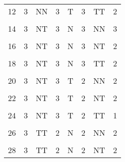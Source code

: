 \begin{table}[H]
{\begin{tabular}[t]{cccccccc}
			12 & 3 & NN & 3 & T & 3 & TT & 2\\
			\cellcolor{gray!6}{13} & \cellcolor{gray!6}{3} & \cellcolor{gray!6}{NT} & \cellcolor{gray!6}{3} & \cellcolor{gray!6}{N} & \cellcolor{gray!6}{3} & \cellcolor{gray!6}{NN} & \cellcolor{gray!6}{3}\\
			14 & 3 & NT & 3 & N & 3 & NN & 3\\
			\cellcolor{gray!6}{15} & \cellcolor{gray!6}{3} & \cellcolor{gray!6}{NT} & \cellcolor{gray!6}{3} & \cellcolor{gray!6}{N} & \cellcolor{gray!6}{3} & \cellcolor{gray!6}{NT} & \cellcolor{gray!6}{2}\\
			16 & 3 & NT & 3 & N & 3 & NT & 2\\
			\cellcolor{gray!6}{17} & \cellcolor{gray!6}{3} & \cellcolor{gray!6}{NT} & \cellcolor{gray!6}{3} & \cellcolor{gray!6}{N} & \cellcolor{gray!6}{3} & \cellcolor{gray!6}{TT} & \cellcolor{gray!6}{2}\\
			18 & 3 & NT & 3 & N & 3 & TT & 2\\
			\cellcolor{gray!6}{19} & \cellcolor{gray!6}{3} & \cellcolor{gray!6}{NT} & \cellcolor{gray!6}{3} & \cellcolor{gray!6}{T} & \cellcolor{gray!6}{2} & \cellcolor{gray!6}{NN} & \cellcolor{gray!6}{2}\\
			20 & 3 & NT & 3 & T & 2 & NN & 2\\
			\cellcolor{gray!6}{21} & \cellcolor{gray!6}{3} & \cellcolor{gray!6}{NT} & \cellcolor{gray!6}{3} & \cellcolor{gray!6}{T} & \cellcolor{gray!6}{2} & \cellcolor{gray!6}{NT} & \cellcolor{gray!6}{2}\\
			22 & 3 & NT & 3 & T & 2 & NT & 2\\
			\cellcolor{gray!6}{23} & \cellcolor{gray!6}{3} & \cellcolor{gray!6}{NT} & \cellcolor{gray!6}{3} & \cellcolor{gray!6}{T} & \cellcolor{gray!6}{2} & \cellcolor{gray!6}{TT} & \cellcolor{gray!6}{1}\\
			24 & 3 & NT & 3 & T & 2 & TT & 1\\
			\cellcolor{gray!6}{25} & \cellcolor{gray!6}{3} & \cellcolor{gray!6}{TT} & \cellcolor{gray!6}{2} & \cellcolor{gray!6}{N} & \cellcolor{gray!6}{2} & \cellcolor{gray!6}{NN} & \cellcolor{gray!6}{2}\\
			26 & 3 & TT & 2 & N & 2 & NN & 2\\
			\cellcolor{gray!6}{27} & \cellcolor{gray!6}{3} & \cellcolor{gray!6}{TT} & \cellcolor{gray!6}{2} & \cellcolor{gray!6}{N} & \cellcolor{gray!6}{2} & \cellcolor{gray!6}{NT} & \cellcolor{gray!6}{2}\\
			28 & 3 & TT & 2 & N & 2 & NT & 2\\

\end{tabular}}
\end{table}
